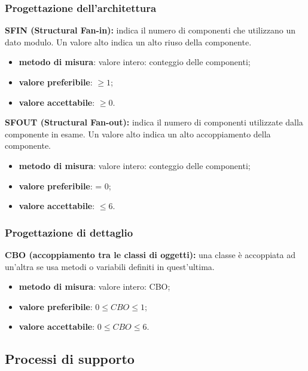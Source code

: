 \subsubsection{Progettazione dell'architettura}
\textbf{SFIN (Structural Fan-in):} indica il numero di componenti che utilizzano un dato modulo. Un valore alto indica un alto riuso della componente.
\begin{itemize}
    \item \textbf{metodo di misura}: valore intero: conteggio delle componenti;
    \item \textbf{valore preferibile}: $\geq 1$;
    \item \textbf{valore accettabile}: $\geq 0$.
\end{itemize}
\textbf{SFOUT (Structural Fan-out):} indica il numero di componenti utilizzate dalla componente in esame. Un valore alto indica un alto accoppiamento della componente.
\begin{itemize}
    \item \textbf{metodo di misura}: valore intero: conteggio delle componenti;
    \item \textbf{valore preferibile}: = 0;
    \item \textbf{valore accettabile}: $\leq 6$.
\end{itemize}
\subsubsection{Progettazione di dettaglio}
\textbf{CBO (accoppiamento tra le classi di oggetti):} una classe è accoppiata ad un'altra se usa metodi o variabili definiti in quest'ultima.
\begin{itemize}
    \item \textbf{metodo di misura}: valore intero: CBO;
    \item \textbf{valore preferibile}: $0 \leq CBO \leq 1$;
    \item \textbf{valore accettabile}: $0 \leq CBO \leq 6$.
\end{itemize}
\subsection{Processi di supporto}
